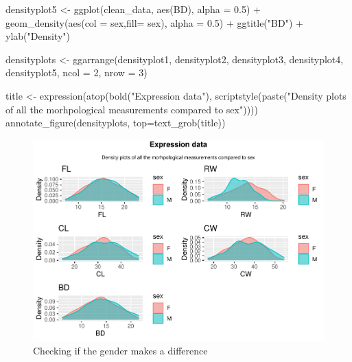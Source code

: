 \documentclass[
]{article}
\newenvironment{Shaded}{}{}
\newcommand{\AttributeTok}[1]{#1}
\newcommand{\DecValTok}[1]{#1}
\newcommand{\FloatTok}[1]{#1}
\newcommand{\FunctionTok}[1]{#1}
\newcommand{\NormalTok}[1]{#1}
\newcommand{\OtherTok}[1]{\textcolor[rgb]{1.00,0.25,0.00}{#1}}
\newcommand{\SpecialCharTok}[1]{\textcolor[rgb]{0.00,0.50,0.50}{#1}}
\newcommand{\StringTok}[1]{\textcolor[rgb]{0.00,0.50,0.50}{#1}}
\begin{document}
\begin{Shaded}
\begin{Highlighting}[]
\NormalTok{densityplot5 }\OtherTok{\textless{}{-}} \FunctionTok{ggplot}\NormalTok{(clean\_data, }\FunctionTok{aes}\NormalTok{(BD), }\AttributeTok{alpha =} \FloatTok{0.5}\NormalTok{) }\SpecialCharTok{+} \FunctionTok{geom\_density}\NormalTok{(}\FunctionTok{aes}\NormalTok{(}\AttributeTok{col =}\NormalTok{ sex,}\AttributeTok{fill=}\NormalTok{ sex), }
                                                                        \AttributeTok{alpha =} \FloatTok{0.5}\NormalTok{) }\SpecialCharTok{+}
\FunctionTok{ggtitle}\NormalTok{(}\StringTok{"BD"}\NormalTok{) }\SpecialCharTok{+} \FunctionTok{ylab}\NormalTok{(}\StringTok{"Density"}\NormalTok{)}

\NormalTok{densityplots }\OtherTok{\textless{}{-}} \FunctionTok{ggarrange}\NormalTok{(densityplot1, densityplot2, densityplot3, densityplot4, densityplot5,}
                   \AttributeTok{ncol =} \DecValTok{2}\NormalTok{, }\AttributeTok{nrow =} \DecValTok{3}\NormalTok{)}

\NormalTok{title }\OtherTok{\textless{}{-}} \FunctionTok{expression}\NormalTok{(}\FunctionTok{atop}\NormalTok{(}\FunctionTok{bold}\NormalTok{(}\StringTok{"Expression data"}\NormalTok{), }
         \FunctionTok{scriptstyle}\NormalTok{(}\FunctionTok{paste}\NormalTok{(}\StringTok{"Density plots of all the morhpological measurements compared to sex"}\NormalTok{))))}
\FunctionTok{annotate\_figure}\NormalTok{(densityplots,}
                \AttributeTok{top=}\FunctionTok{text\_grob}\NormalTok{(title))}
\end{Highlighting}
\end{Shaded}

\begin{figure}[H]

{\centering \includegraphics{Log_files/figure-latex/figure4-1} 

}

\caption{Checking if the gender makes a difference}\label{fig:figure4}
\end{figure}
\end{document}
